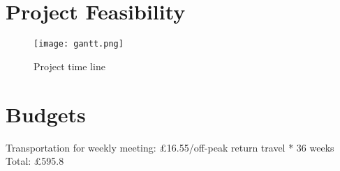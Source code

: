 \documentclass[11pt, a4paper]{article}
\begin{document}
\section*{Project Feasibility}
\begin{figure}[h!]
	\centering\texttt{[image: gantt.png]}
	\caption{Project time line}
\end{figure}



\section*{Budgets}

{\large Transportation for weekly meeting:}
\pounds 16.55/off-peak return travel * 36 weeks
\vspace{0.5\baselineskip}
{\large Total:} \pounds 595.8
\end{document}

